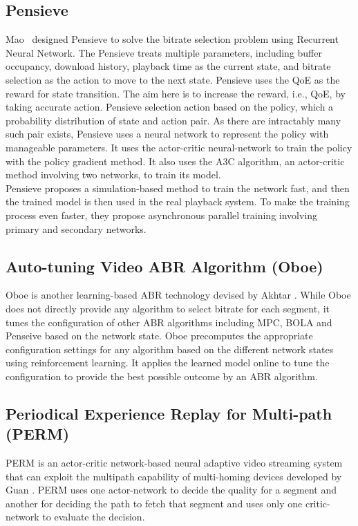 \subsection{Pensieve}
Mao \etal\ designed Pensieve\cite{mao2017neural} to solve the bitrate selection problem using Recurrent Neural Network. The Pensieve treats multiple parameters, including buffer occupancy, download history, playback time as the current state, and bitrate selection as the action to move to the next state. Pensieve uses the QoE as the reward for state transition. The aim here is to increase the reward, i.e., QoE, by taking accurate action. Pensieve selection action based on the policy, which a probability distribution of state and action pair. As there are intractably many such pair exists, Pensieve uses a neural network to represent the policy with manageable parameters. It uses the actor-critic neural-network to train the policy with the policy gradient method\cite{sutton1999policy}. It also uses the A3C\cite{10.5555/3045390.3045594} algorithm, an actor-critic method involving two networks, to train its model.\\
Pensieve proposes a simulation-based method to train the network fast, and then the trained model is then used in the real playback system. To make the training process even faster, they propose asynchronous parallel training involving primary and secondary networks.

\subsection{Auto-tuning Video ABR Algorithm (Oboe)}
Oboe\cite{Akhtar2018} is another learning-based ABR technology devised by Akhtar \etal. While Oboe does not directly provide any algorithm to select bitrate for each segment, it tunes the configuration of other ABR algorithms including MPC\cite{yin2015control,10.1145/2670518.2673877}, BOLA\cite{Spiteri2016} and Penseive\cite{mao2017neural} based on the network state. Oboe precomputes the appropriate configuration settings for any algorithm based on the different network states using reinforcement learning. It applies the learned model online to tune the configuration to provide the best possible outcome by an ABR algorithm.


\subsection{Periodical Experience Replay for Multi-path (PERM)}
PERM\cite{9155492} is an actor-critic network-based neural adaptive video streaming system that can exploit the multipath capability of multi-homing devices developed by Guan \etal. PERM uses one actor-network to decide the quality for a segment and another for deciding the path to fetch that segment and uses only one critic-network to evaluate the decision.

